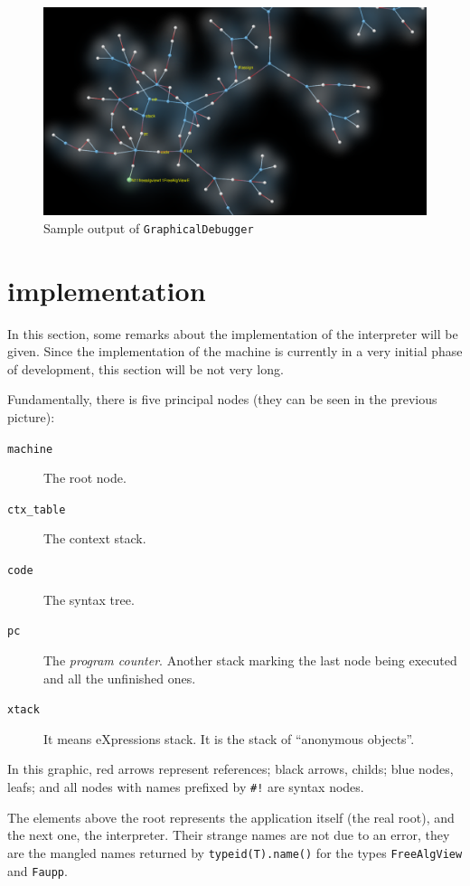 \documentclass{article}
\begin{document}
\begin{figure}[h!]
  \centering
  \includegraphics[scale=0.3]{capture.png}
  \caption{Sample output of \texttt{GraphicalDebugger}}
  \label{fig:graphdeb}
\end{figure}

\section{\faupp implementation}
\label{sec:fauppimpl}
In this section, some remarks about the implementation of the interpreter will
be given. Since the implementation of the machine is currently in a very initial
phase of development, this section will be not very long.

Fundamentally, there is five principal nodes (they can be seen in the previous
picture):

\begin{description}
  \item[\texttt{machine}] The root node.
  \item[\texttt{ctx\_table}] The context stack.
  \item[\texttt{code}] The syntax tree.
  \item[\texttt{pc}] The \textit{program counter}. Another stack marking the last
    node being executed and all the unfinished ones.
  \item[\texttt{xtack}] It means eXpressions stack. It is the stack of
    ``anonymous objects''.
\end{description}

In this graphic, red arrows represent references; black arrows, childs; blue
nodes, leafs; and all nodes with names prefixed by \texttt{\#!} are syntax nodes.

The elements above the root represents the application itself (the real root),
and the next one, the interpreter. Their strange names are not due to an error,
they are the mangled names returned by \texttt{typeid(T).name()} for the types
\texttt{FreeAlgView} and \texttt{Faupp}.
\end{document}
